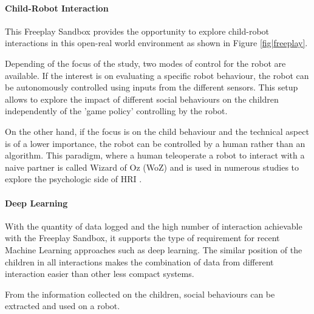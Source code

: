 \documentclass[sigconf]{acmart}
\begin{document}
\paragraph{Child-Robot Interaction}
\label{ssec|CRI}
This Freeplay Sandbox provides the opportunity to explore child-robot
interactions in this open-real world environment as shown in Figure
\ref{fig|freeplay}. 

Depending of the focus of the study, two modes of control for the robot are
available. If the interest is on evaluating a specific robot behaviour, the
robot can be autonomously controlled using inputs from the different sensors.
This setup allows to explore the impact of different social behaviours on the
children independently of the 'game policy' controlling by the robot. 

On the other hand, if the focus is on the child behaviour and the technical
aspect is of a lower importance, the robot can be controlled by a human rather
than an algorithm. This paradigm, where a human teleoperate a robot to interact
with a naive partner is called Wizard of Oz (WoZ) and is used in numerous
studies to explore the psychologic side of HRI \cite{riek2012wizard}. 

\paragraph{Deep Learning}

With the quantity of data logged and the high number of interaction achievable with the Freeplay Sandbox, it supports the type of requirement for recent Machine Learning approaches such as deep learning. The similar position of the children in all interactions makes the combination of data from different interaction easier than other less compact systems.

From the information collected on the children, social behaviours can be extracted and used on a robot.





\end{document}
